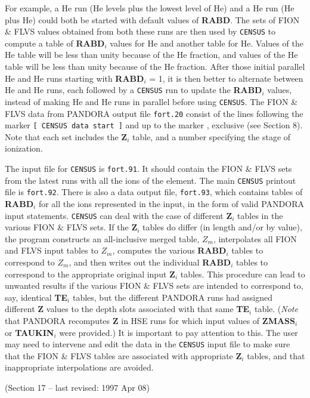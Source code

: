 For example, a He{\sI} run (He{\sI} levels plus the lowest level of He\sII)
and a He{\sII} run (He{\sII} plus He\sIII) could both be started with default
values of {\bf RABD}. The sets of FION \& FLVS values obtained from
both these runs are then used by {\tt CENSUS} to compute a table
of {\bf RABD}$_i$ values for He{\sI} and another table for He\sII.
Values of the He{\sI} table will be less than unity because of
the He{\sIII} fraction, and values of the He{\sII} table will be less
than unity because of the He{\sI} fraction. \break After those initial parallel
He{\sI} and He{\sII} runs starting with {\bf RABD}$_i$ = 1,
it is then better to alternate between He{\sI} and He{\sII} runs, each
followed by a {\tt CENSUS} run to update the {\bf RABD}$_i$ values,
instead of making He{\sI} and He{\sII} runs in parallel before using
{\tt CENSUS}.
\blankline
The FION \& FLVS data from PANDORA output file {\tt fort.20} consist
of the lines following the marker {\tt [ CENSUS data start ]} and
up to the marker , exclusive (see Section 8).
Note that each set includes the {\bf Z}$_i$ table, and a number specifying
the stage of ionization. 

The input file for {\tt CENSUS} is {\tt fort.91}. It should contain the
FION \& FLVS sets from the latest runs with all the ions of the element.
The main {\tt CENSUS} \break printout file is {\tt fort.92}. There is also a
data output file, {\tt fort.93}, which contains tables of {\bf RABD}$_i$
for all the ions represented in the input, in the form of valid
PANDORA input statements.
\blankline
{\tt CENSUS} can deal with the case of different {\bf Z}$_i$ tables in the
various FION \& FLVS sets. If the {\bf Z}$_i$ tables do differ (in length
and/or by value), the program constructs an all-inclusive merged
table, $Z_{m}$, interpolates all FION and FLVS input tables to
$Z_{m}$, computes the various {\bf RABD}$_i$ tables to correspond
to $Z_{m}$, and then writes out the individual {\bf RABD}$_i$ tables
to correspond to the appropriate original input {\bf Z}$_i$ tables. This
procedure can lead to unwanted results if the various FION \& FLVS sets
are intended to correspond to, say, identical {\bf TE}$_i$ tables, but
the different PANDORA runs had assigned different {\bf Z} values to
the depth slots associated with that same {\bf TE}$_i$ table. ({\it Note}
that PANDORA recomputes {\bf Z} in HSE runs for which input values of
{\bf ZMASS}$_i$ or {\bf TAUKIN}$_i$ were provided.) It is important to
pay attention to this. The user may need to intervene and edit the data
in the {\tt CENSUS} input file to make sure that the FION \& FLVS tables
are associated with appropriate {\bf Z}$_i$ tables, and that inappropriate
interpolations are avoided.


\blankline
\blankline
\vfill \vfill
\vfill \vfill
\vfill \vfill
\vfill \vfill
\vfill \vfill
\vfill \vfill
\vfill \vfill
\vfill \vfill
\noindent (Section 17 -- last revised: 1997 Apr 08) \par
{}
\ej
